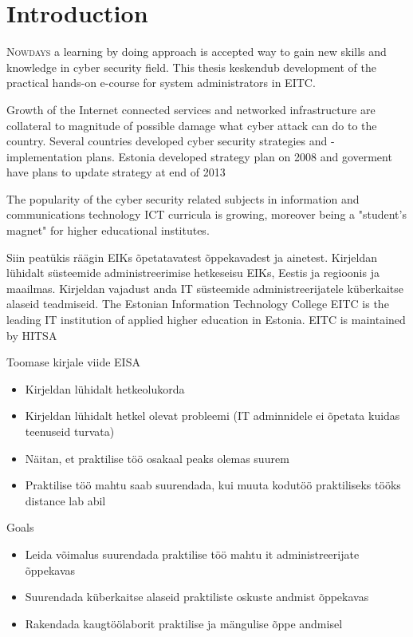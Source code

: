 \chapter{Introduction}
\label{Introduction}
\lettrine[lraise=0.1, nindent=0em, slope=-.5em]{\color{Violet}N}{owdays} a learning by doing approach is accepted way to gain new skills and knowledge in cyber security field. This thesis keskendub development of the practical hands-on e-course for system administrators in \gls{EITC}.

Growth of the Internet connected services and networked infrastructure are collateral to magnitude of possible damage what cyber attack can do to the country. Several countries developed cyber security strategies and -implementation plans.
Estonia developed strategy plan on 2008 \citep{Strategy2008} and goverment have plans to update strategy at end of 2013 \citep{StrategyProposal2013}
  
  
The popularity of the cyber security related subjects in information and communications technology \gls{ICT} curricula is growing, moreover being a "student's magnet" for higher educational institutes.\citep{CyberIsHot}
  


Siin peatükis räägin EIKs õpetatavatest õppekavadest ja ainetest. Kirjeldan lühidalt süsteemide administreerimise hetkeseisu EIKs, Eestis ja regioonis ja maailmas. Kirjeldan vajadust anda IT süsteemide administreerijatele küberkaitse alaseid teadmiseid.
The Estonian Information Technology College \gls{EITC} is the leading IT institution of applied higher education in Estonia. \cite{EITC} \gls{EITC} is maintained by \gls{HITSA}




Toomase kirjale viide \gls{EISA}


\begin{itemize}
	\item Kirjeldan lühidalt hetkeolukorda
	\item Kirjeldan lühidalt hetkel olevat probleemi (IT adminnidele ei õpetata kuidas teenuseid turvata)
	\item Näitan, et praktilise töö osakaal peaks olemas suurem
	\item Praktilise töö mahtu saab suurendada, kui muuta kodutöö praktiliseks tööks distance lab abil
	
\end{itemize}

Goals
\begin{itemize}
	\item Leida võimalus suurendada praktilise töö mahtu it administreerijate õppekavas
	\item Suurendada küberkaitse alaseid praktiliste oskuste andmist õppekavas
	\item Rakendada kaugtöölaborit praktilise ja mängulise õppe andmisel
\end{itemize}


